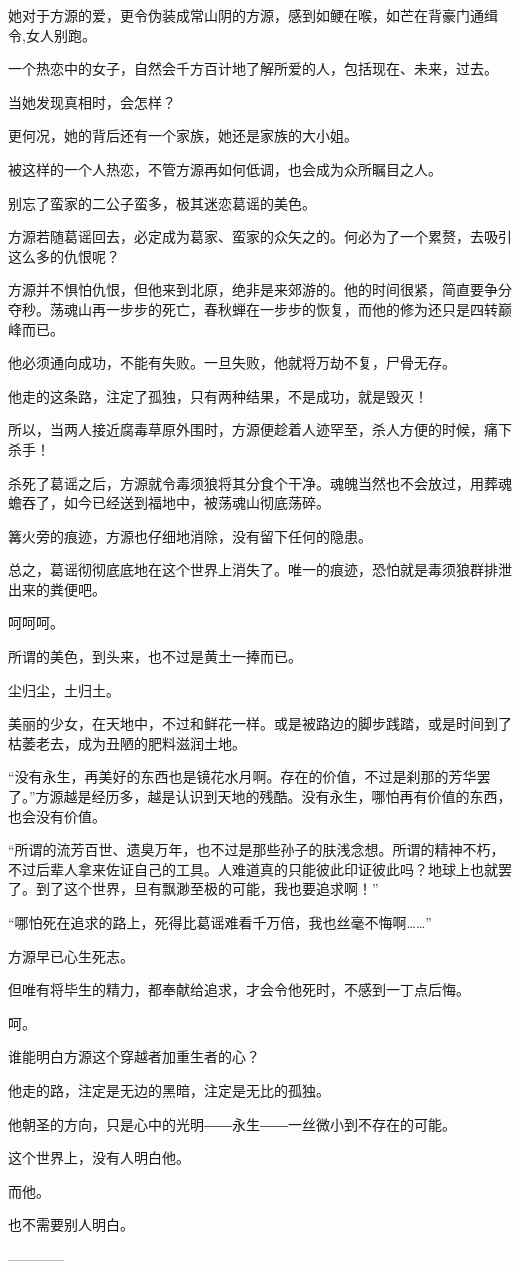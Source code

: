 \begin{this_body}
她对于方源的爱，更令伪装成常山阴的方源，感到如鲠在喉，如芒在背豪门通缉令,女人别跑。

一个热恋中的女子，自然会千方百计地了解所爱的人，包括现在、未来，过去。

当她发现真相时，会怎样？

更何况，她的背后还有一个家族，她还是家族的大小姐。

被这样的一个人热恋，不管方源再如何低调，也会成为众所瞩目之人。

别忘了蛮家的二公子蛮多，极其迷恋葛谣的美色。

方源若随葛谣回去，必定成为葛家、蛮家的众矢之的。何必为了一个累赘，去吸引这么多的仇恨呢？

方源并不惧怕仇恨，但他来到北原，绝非是来郊游的。他的时间很紧，简直要争分夺秒。荡魂山再一步步的死亡，春秋蝉在一步步的恢复，而他的修为还只是四转巅峰而已。

他必须通向成功，不能有失败。一旦失败，他就将万劫不复，尸骨无存。

他走的这条路，注定了孤独，只有两种结果，不是成功，就是毁灭！

所以，当两人接近腐毒草原外围时，方源便趁着人迹罕至，杀人方便的时候，痛下杀手！

杀死了葛谣之后，方源就令毒须狼将其分食个干净。魂魄当然也不会放过，用葬魂蟾吞了，如今已经送到福地中，被荡魂山彻底荡碎。

篝火旁的痕迹，方源也仔细地消除，没有留下任何的隐患。

总之，葛谣彻彻底底地在这个世界上消失了。唯一的痕迹，恐怕就是毒须狼群排泄出来的粪便吧。

呵呵呵。

所谓的美色，到头来，也不过是黄土一捧而已。

尘归尘，土归土。

美丽的少女，在天地中，不过和鲜花一样。或是被路边的脚步践踏，或是时间到了枯萎老去，成为丑陋的肥料滋润土地。

“没有永生，再美好的东西也是镜花水月啊。存在的价值，不过是刹那的芳华罢了。”方源越是经历多，越是认识到天地的残酷。没有永生，哪怕再有价值的东西，也会没有价值。

“所谓的流芳百世、遗臭万年，也不过是那些孙子的肤浅念想。所谓的精神不朽，不过后辈人拿来佐证自己的工具。人难道真的只能彼此印证彼此吗？地球上也就罢了。到了这个世界，旦有飘渺至极的可能，我也要追求啊！”

“哪怕死在追求的路上，死得比葛谣难看千万倍，我也丝毫不悔啊……”

方源早已心生死志。

但唯有将毕生的精力，都奉献给追求，才会令他死时，不感到一丁点后悔。

呵。

谁能明白方源这个穿越者加重生者的心？

他走的路，注定是无边的黑暗，注定是无比的孤独。

他朝圣的方向，只是心中的光明――永生――一丝微小到不存在的可能。

这个世界上，没有人明白他。

而他。

也不需要别人明白。

------------

\end{this_body}


